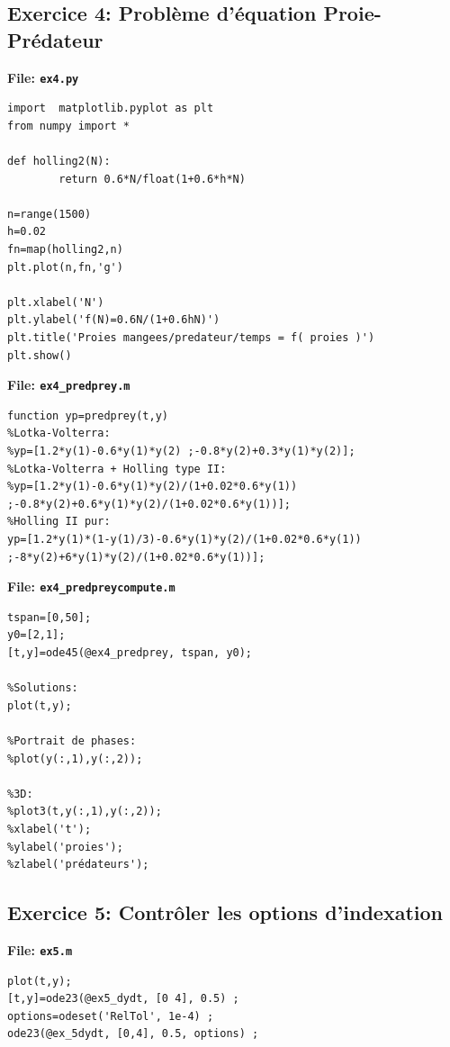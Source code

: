 \documentclass[a4paper,12pt,landscape]{article}
\begin{document}
\subsection{Exercice 4: Problème d'équation Proie-Prédateur}
\textbf{File: \texttt{ex4.py}}
\begin{tiny}
\begin{verbatim}
import  matplotlib.pyplot as plt
from numpy import *

def holling2(N):
        return 0.6*N/float(1+0.6*h*N)	

n=range(1500)
h=0.02
fn=map(holling2,n)
plt.plot(n,fn,'g')

plt.xlabel('N')
plt.ylabel('f(N)=0.6N/(1+0.6hN)')
plt.title('Proies mangees/predateur/temps = f( proies )')
plt.show()
\end{verbatim}
\end{tiny}
\newpage
\textbf{File: \texttt{ex4\_predprey.m}}
\begin{tiny}
\begin{verbatim}
function yp=predprey(t,y)
%Lotka-Volterra:
%yp=[1.2*y(1)-0.6*y(1)*y(2) ;-0.8*y(2)+0.3*y(1)*y(2)];
%Lotka-Volterra + Holling type II:
%yp=[1.2*y(1)-0.6*y(1)*y(2)/(1+0.02*0.6*y(1)) ;-0.8*y(2)+0.6*y(1)*y(2)/(1+0.02*0.6*y(1))];
%Holling II pur:
yp=[1.2*y(1)*(1-y(1)/3)-0.6*y(1)*y(2)/(1+0.02*0.6*y(1)) ;-8*y(2)+6*y(1)*y(2)/(1+0.02*0.6*y(1))];
\end{verbatim}
\end{tiny}

\textbf{File: \texttt{ex4\_predpreycompute.m}}
\begin{tiny}
\begin{verbatim}
tspan=[0,50];
y0=[2,1];
[t,y]=ode45(@ex4_predprey, tspan, y0);

%Solutions:
plot(t,y);

%Portrait de phases:
%plot(y(:,1),y(:,2));

%3D:
%plot3(t,y(:,1),y(:,2));
%xlabel('t');
%ylabel('proies');
%zlabel('prédateurs');

\end{verbatim}
\end{tiny}
\subsection{Exercice 5: Contrôler les options d'indexation}
\textbf{File: \texttt{ex5.m}}
\begin{tiny}
\begin{verbatim}
plot(t,y);
[t,y]=ode23(@ex5_dydt, [0 4], 0.5) ;
options=odeset('RelTol', 1e-4) ;
ode23(@ex_5dydt, [0,4], 0.5, options) ; 
\end{verbatim}
\end{tiny}
\end{document}
